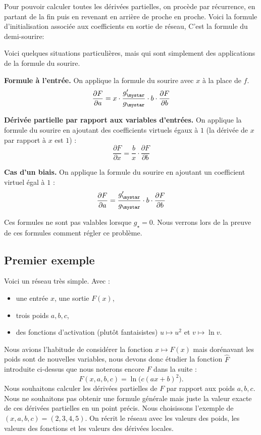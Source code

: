 \documentclass[11pt,class=report,crop=false]{standalone}
\begin{document}
Pour pouvoir calculer toutes les dérivées partielles, on procède par récurrence, en partant de la fin puis en revenant en arrière de proche en proche. Voici la formule d'initialisation associée aux coefficients en sortie de réseau,
C'est la \og{}formule du demi-sourire\fg{}:
\bigskip

Voici quelques situations particulières, mais qui sont simplement des applications de la formule du sourire.

\textbf{Formule à l'entrée.} On applique la formule du sourire avec $x$ à la place de $f$.
$$\frac{\partial F}{\partial a} = x \cdot \frac{g'_\mystar}{g_\mystar} \cdot b \cdot \frac{\partial F}{\partial b}$$ 

\textbf{Dérivée partielle par rapport aux variables d'entrées.}
On applique la formule du sourire en ajoutant des coefficients virtuels égaux à $1$ (la dérivée de $x$ par rapport à $x$ est $1$) :
$$\frac{\partial F}{\partial x} = \frac{b}{x} \cdot \frac{\partial F}{\partial b}$$


\textbf{Cas d'un biais.} On applique la formule du sourire en ajoutant un coefficient virtuel égal à $1$ :
$$\frac{\partial F}{\partial a} = \frac{g'_\mystar}{g_\mystar} \cdot b \cdot \frac{\partial F}{\partial b}$$ 


\begin{remarque*}
Ces formules ne sont pas valables lorsque $g_\star=0$. Nous verrons lors de la preuve de ces formules comment régler ce problème.
\end{remarque*}


\subsection{Premier exemple}

Voici un réseau très simple.
Avec :
\begin{itemize}
  \item une entrée $x$, une sortie $F(x)$,
  \item trois poids $a,b,c$,
  \item des fonctions d'activation (plutôt fantaisistes) $u \mapsto u^2$ et $v \mapsto \ln v$.
\end{itemize}
Nous avions l'habitude de considérer la fonction $x \mapsto F(x)$ mais dorénavant les poids sont de nouvelles variables, nous devons donc étudier la fonction 
$\widehat F$ introduite ci-dessus que nous noterons encore $F$ dans la suite :
$$F(x,a,b,c) = \ln\big( c (ax+b)^2 \big).$$
Nous souhaitons calculer les dérivées partielles de $F$ par rapport aux poids $a,b,c$. Nous ne souhaitons pas obtenir une formule générale mais juste la valeur exacte de ces dérivées partielles en un point précis. Nous choisissons l'exemple de 
$(x,a,b,c) = (2,3,4,5)$.
On récrit le réseau avec les valeurs des poids, les valeurs des fonctions et les valeurs des dérivées locales.
\end{document}
